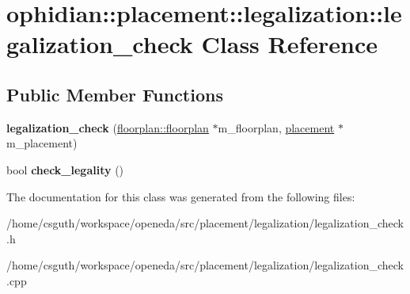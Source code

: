 \hypertarget{classophidian_1_1placement_1_1legalization_1_1legalization__check}{\section{ophidian\-:\-:placement\-:\-:legalization\-:\-:legalization\-\_\-check Class Reference}
\label{classophidian_1_1placement_1_1legalization_1_1legalization__check}
}
\subsection*{Public Member Functions}
\begin{DoxyCompactItemize}
\item 
\hypertarget{classophidian_1_1placement_1_1legalization_1_1legalization__check_aae52d9cecff401200647aace0a9da3f3}{{\bfseries legalization\-\_\-check} (\hyperlink{classophidian_1_1floorplan_1_1floorplan}{floorplan\-::floorplan} $\ast$m\-\_\-floorplan, \hyperlink{classophidian_1_1placement_1_1placement}{placement} $\ast$m\-\_\-placement)}\label{classophidian_1_1placement_1_1legalization_1_1legalization__check_aae52d9cecff401200647aace0a9da3f3}

\item 
\hypertarget{classophidian_1_1placement_1_1legalization_1_1legalization__check_a60592335813ff903a4efb7903bbf12b3}{bool {\bfseries check\-\_\-legality} ()}\label{classophidian_1_1placement_1_1legalization_1_1legalization__check_a60592335813ff903a4efb7903bbf12b3}

\end{DoxyCompactItemize}


The documentation for this class was generated from the following files\-:\begin{DoxyCompactItemize}
\item 
/home/csguth/workspace/openeda/src/placement/legalization/legalization\-\_\-check.\-h\item 
/home/csguth/workspace/openeda/src/placement/legalization/legalization\-\_\-check.\-cpp\end{DoxyCompactItemize}
